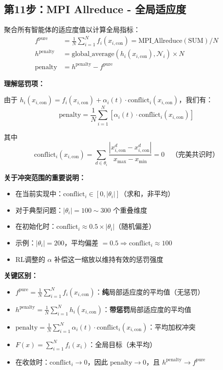 \documentclass[11pt,a3paper]{ctexart}
\begin{document}
\subsection{第11步：MPI Allreduce - 全局适应度}

聚合所有智能体的适应度值以计算全局指标：
\begin{align}
f^{\text{pure}} &= \frac{1}{N}\sum_{i=1}^N f_i(x_{i,\text{con}}) = \text{MPI\_Allreduce}(\text{SUM}) / N \\
h^{\text{penalty}} &= \text{global\_average}(h_i(x_{i,\text{con}}), \mathcal{N}_i) \times N \\
\text{penalty} &= h^{\text{penalty}} - f^{\text{pure}}
\end{align}

\textbf{理解惩罚项：}

由于 $h_i(x_{i,\text{con}}) = f_i(x_{i,\text{con}}) + \alpha_i(t) \cdot \text{conflict}_i(x_{i,\text{con}})$，我们有：
\begin{equation}
\text{penalty} = \frac{1}{N}\sum_{i=1}^N \left[\alpha_i(t) \cdot \text{conflict}_i(x_{i,\text{con}})\right]
\end{equation}

其中
\begin{equation}
\text{conflict}_i(x_{i,\text{con}}) = \sum_{d \in \theta_i} \frac{|x_{i,\text{con}}^d - x_{i,\text{con}}^d|}{x_{\max} - x_{\min}} = 0 \quad \text{（完美共识时）}
\end{equation}

\textbf{关于冲突范围的重要说明：}
\begin{itemize}
    \item 在当前实现中：$\text{conflict}_i \in [0, |\theta_i|]$（求和，非平均）
    \item 对于典型问题：$|\theta_i| = 100 \sim 300$ 个重叠维度
    \item 在初始化时：$\text{conflict}_i \approx 0.5 \times |\theta_i|$（随机偏差）
    \item 示例：$|\theta_i| = 200$，平均偏差 $= 0.5 \Rightarrow \text{conflict}_i \approx 100$
    \item RL调整的 $\alpha$ 补偿这一缩放以维持有效的惩罚强度
\end{itemize}

\textbf{关键区别：}
\begin{itemize}
    \item $f^{\text{pure}} = \frac{1}{N}\sum_{i=1}^N f_i(x_{i,\text{con}})$：\textbf{纯}局部适应度的平均值（无惩罚）
    \item $h^{\text{penalty}} = \frac{1}{N}\sum_{i=1}^N h_i(x_{i,\text{con}})$：\textbf{带惩罚}局部适应度的平均值
    \item $\text{penalty} = \frac{1}{N}\sum_{i=1}^N \alpha_i(t) \cdot \text{conflict}_i(x_{i,\text{con}})$：平均加权冲突
    \item $F(x) = \sum_{i=1}^N f_i(x_i)$：全局目标（未平均）
    \item 在收敛时：$\text{conflict}_i \to 0$，因此 $\text{penalty} \to 0$，且 $h^{\text{penalty}} \to f^{\text{pure}}$
\end{itemize}
\end{document}
